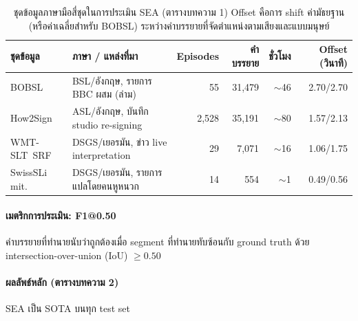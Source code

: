 \documentclass[11pt,a4paper]{article}
\def\textbf#1{#1}%
\begin{document}
\begin{table}[h]
\centering
\small
\begin{tabularx}{\linewidth}{lXrrrr}
\toprule
\textbf{ชุดข้อมูล} & \textbf{ภาษา / แหล่งที่มา} & \textbf{Episodes} & \textbf{คำบรรยาย} & \textbf{ชั่วโมง} & \textbf{Offset (วินาที)} \\
\midrule
BOBSL          & BSL/อังกฤษ, รายการ BBC ผสม (ล่าม)   & 55    & 31,479 & $\sim$46  & 2.70/2.70 \\
How2Sign       & ASL/อังกฤษ, บันทึก studio re-signing & 2,528 & 35,191 & $\sim$80  & 1.57/2.13 \\
WMT-SLT~SRF    & DSGS/เยอรมัน, ข่าว live interpretation & 29  & 7,071  & $\sim$16  & 1.06/1.75 \\
SwissSLi mit.\ & DSGS/เยอรมัน, รายการแปลโดยคนหูหนวก & 14   & 554    & $\sim$1   & 0.49/0.56 \\
\bottomrule
\end{tabularx}
\caption{ชุดข้อมูลภาษามือสี่ชุดในการประเมิน SEA (ตารางบทความ 1)
Offset คือการ shift ค่ามัธยฐาน (หรือค่าเฉลี่ยสำหรับ BOBSL)
ระหว่างคำบรรยายที่จัดตำแหน่งตามเสียงและแบบมนุษย์}
\label{tab:paper-datasets}
\end{table}

\paragraph{เมตริกการประเมิน: F1@0.50}
คำบรรยายที่ทำนายนับว่าถูกต้องเมื่อ segment ที่ทำนายทับซ้อนกับ ground truth
ด้วย intersection-over-union (IoU) $\ge 0.50$

\paragraph{ผลลัพธ์หลัก (ตารางบทความ 2)} SEA เป็น SOTA บนทุก test set
\end{document}
